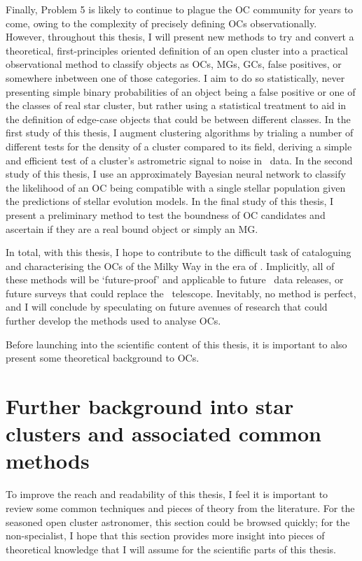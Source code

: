 Finally, Problem 5 is likely to continue to plague the OC community for years to come, owing to the complexity of precisely defining OCs observationally. However, throughout this thesis, I will present new methods to try and convert a theoretical, first-principles oriented definition of an open cluster into a practical observational method to classify objects as OCs, MGs, GCs, false positives, or somewhere inbetween one of those categories. I aim to do so statistically, never presenting simple binary probabilities of an object being a false positive or one of the classes of real star cluster, but rather using a statistical treatment to aid in the definition of edge-case objects that could be between different classes. In the first study of this thesis, I augment clustering algorithms by trialing a number of different tests for the density of a cluster compared to its field, deriving a simple and efficient test of a cluster's astrometric signal to noise in \gaia\ data. In the second study of this thesis, I use an approximately Bayesian neural network to classify the likelihood of an OC being compatible with a single stellar population given the predictions of stellar evolution models. In the final study of this thesis, I present a preliminary method to test the boundness of OC candidates and ascertain if they are a real bound object or simply an MG.

In total, with this thesis, I hope to contribute to the difficult task of cataloguing and characterising the OCs of the Milky Way in the era of \gaia. Implicitly, all of these methods will be `future-proof' and applicable to future \gaia\ data releases, or future surveys that could replace the \gaia\ telescope. Inevitably, no method is perfect, and I will conclude by speculating on future avenues of research that could further develop the methods used to analyse OCs.


Before launching into the scientific content of this thesis, it is important to also present some theoretical background to OCs.


\section{Further background into star clusters and associated common methods}
\label{sec:intro:theory}

To improve the reach and readability of this thesis, I feel it is important to review some common techniques and pieces of theory from the literature. For the seasoned open cluster astronomer, this section could be browsed quickly; for the non-specialist, I hope that this section provides more insight into pieces of theoretical knowledge that I will assume for the scientific parts of this thesis.

